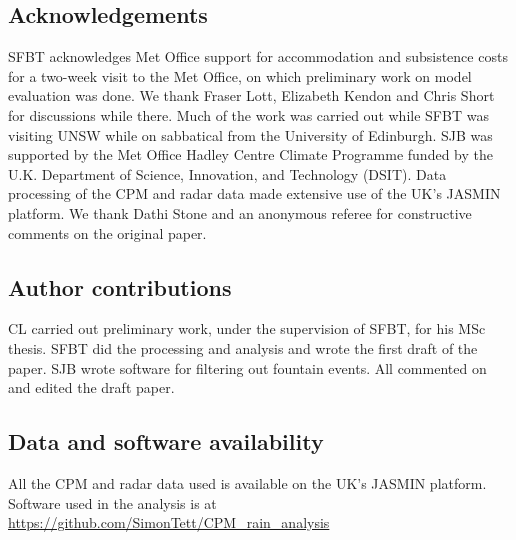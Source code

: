 \documentclass[11pt,a4paper]{article}
\begin{document}
\printbibliography %

\subsection*{Acknowledgements}
SFBT acknowledges  Met Office support for accommodation and subsistence costs for a two-week visit to the Met Office, on which preliminary work on model evaluation was done. We thank Fraser Lott,  Elizabeth Kendon and Chris Short for discussions while there. Much of the  work was carried out while SFBT was visiting UNSW while on sabbatical from the University of Edinburgh.  SJB was supported by the Met Office Hadley Centre Climate Programme funded by the U.K. Department of Science, Innovation, and Technology (DSIT). Data processing of the CPM and radar data made extensive use of the UK's JASMIN platform.  We thank Dathi Stone and an anonymous referee for constructive comments on the original paper. 

\subsection*{Author contributions}
CL carried out preliminary work, under the supervision of SFBT, for his MSc thesis. SFBT did the processing and analysis and wrote the first draft of the paper. SJB wrote software for filtering out fountain events. All commented on and edited the draft paper. 

\subsection*{Data and software availability}
All the CPM and radar data used is available on the UK's JASMIN platform. Software used in the analysis is at \url{https://github.com/SimonTett/CPM_rain_analysis}
\clearpage




\clearpage



\clearpage
\end{document}

